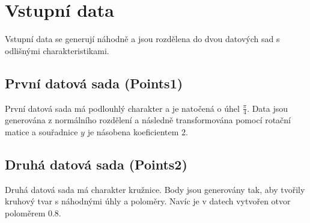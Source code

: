 \section{Vstupní data}
Vstupní data se generují náhodně a jsou rozdělena do dvou datových sad s odlišnými charakteristikami.

\subsection{První datová sada (Points1)}
První datová sada má podlouhlý charakter a je natočená o úhel \(\frac{\pi}{4}\). Data jsou generována z normálního rozdělení a následně transformována pomocí rotační matice a souřadnice \(y\) je násobena koeficientem \(2\).

\subsection{Druhá datová sada (Points2)}
Druhá datová sada má charakter kružnice. Body jsou generovány tak, aby tvořily kruhový tvar s náhodnými úhly a poloměry. Navíc je v datech vytvořen otvor poloměrem 0.8.